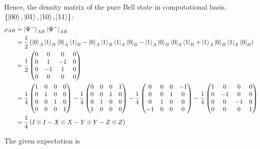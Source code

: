 \documentclass[a4paper,11pt]{article}
\begin{document}
Hence, the density matrix of the pure Bell state in computational basis, $\{\ket{00}, \ket{01}, \ket{10}, \ket{11}\}$:
\begin{align}
    \rho_{AB}
    &=\ket{\Psi^-}_{AB}\bra{\Psi^-}_{AB} \\
    &=\frac{1}{2}\left(\ket{0}_A\ket{1}_B\bra{0}_A\bra{1}_B-\ket{0}_A\ket{1}_B\bra{1}_A\bra{0}_B-\ket{1}_A\ket{0}_B\bra{0}_A\bra{1}_B+\ket{1}_A\ket{0}_B\bra{1}_A\bra{0}_B\right)\\
    &=\frac12\begin{pmatrix}
        0 &  0 &  0 & 0 \\
        0 &  1 & -1 & 0 \\
        0 & -1 &  1 & 0 \\
        0 &  0 &  0 & 0
    \end{pmatrix} \\
    &=\frac14\begin{pmatrix}
        1 &  0 &  0 & 0 \\
        0 &  1 &  0 & 0 \\
        0 &  0 &  1 & 0 \\
        0 &  0 &  0 & 1
    \end{pmatrix}
    - \frac14\begin{pmatrix}
        0 & 0 & 0 & 1 \\
        0 & 0 & 1 & 0 \\
        0 & 1 & 0 & 0 \\
        1 & 0 & 0 & 0
    \end{pmatrix}
    - \frac14\begin{pmatrix}
         0 & 0 & 0 & -1 \\
         0 & 0 & 1 &  0 \\
         0 & 1 & 0 &  0 \\
        -1 & 0 & 0 &  0
    \end{pmatrix}
    - \frac14\begin{pmatrix}
        1 &  0 &  0 & 0 \\
        0 & -1 &  0 & 0 \\
        0 &  0 & -1 & 0 \\
        0 &  0 &  0 & 1
    \end{pmatrix}\\
    &=\frac{1}{4}\left(I\otimes I - X\otimes X - Y\otimes Y - Z\otimes Z\right)
\end{align}

The given expectation is 
\end{document}

